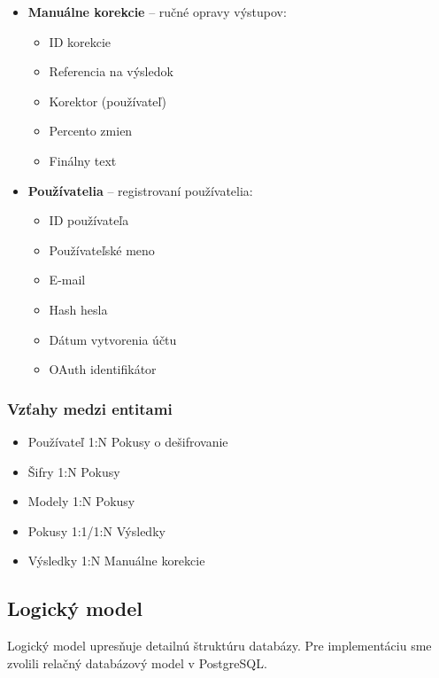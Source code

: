 \documentclass[12pt,a4paper]{article}
\begin{document}
\begin{itemize}
    \item \textbf{Manuálne korekcie} -- ručné opravy výstupov:
    \begin{itemize}
        \item ID korekcie
        \item Referencia na výsledok
        \item Korektor (používateľ)
        \item Percento zmien
        \item Finálny text
    \end{itemize}
    
    \item \textbf{Používatelia} -- registrovaní používatelia:
    \begin{itemize}
        \item ID používateľa
        \item Používateľské meno
        \item E-mail
        \item Hash hesla
        \item Dátum vytvorenia účtu
        \item OAuth identifikátor
    \end{itemize}
\end{itemize}

\subsubsection{Vzťahy medzi entitami}
\begin{itemize}
    \item Používateľ 1:N Pokusy o dešifrovanie
    \item Šifry 1:N Pokusy
    \item Modely 1:N Pokusy
    \item Pokusy 1:1/1:N Výsledky
    \item Výsledky 1:N Manuálne korekcie
\end{itemize}

\subsection{Logický model}
Logický model upresňuje detailnú štruktúru databázy. Pre implementáciu sme zvolili relačný databázový model v PostgreSQL.
\end{document}
